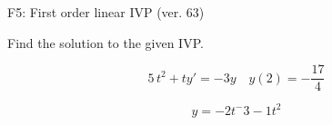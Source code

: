 \begin{exercise}
  \begin{exerciseTitle}F5: First order linear IVP (ver. 63)\end{exerciseTitle}
  \begin{exerciseStatement}
    
Find the solution to the given IVP.

    
\[5 \, t^{2} +ty'= -3 y \hspace{1em} y( 2 ) = -\frac{17}{4}\]

  \end{exerciseStatement}
  \begin{exerciseAnswer}
    
\[y= -2 t^ -3 -1 t^{2}\]

  \end{exerciseAnswer}
\end{exercise}